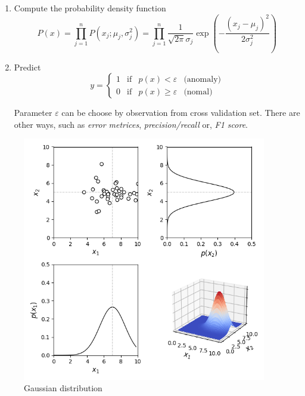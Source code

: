 \begin{itemize}
\begin{enumerate}
        \item Compute the probability density function 
        \begin{equation}
            P(x) = \prod_{j=1}^{n} P(x_j;\mu_j,\sigma_j^2) = \prod_{j=1}^{n} \frac{1}{\sqrt{2\pi}\sigma_j}\exp\left({-\frac{(x_j-\mu_j)^2}{2\sigma_j^2}}\right)
        \end{equation}
        
        \item Predict
        \begin{equation}
            y = \left\{
            \begin{array}{llll}
                1 & \text{if} & p(x) <    \varepsilon & \text{(anomaly)}  \\
                0 & \text{if} & p(x) \geq \varepsilon & \text{(nomal)} 
            \end{array}\right.
        \end{equation}
        
        Parameter $\varepsilon$ can be choose by observation from cross validation set.
        There are other ways, such as \emph{error metrices}, \emph{precision/recall} or, \emph{F1 score}.
    \end{enumerate}
    
    \begin{figure}[!htbp]
        \centering
        \includegraphics[width=4.2in]{./images/gaussianDistribution_3D.png}
        \caption{Gaussian distribution}
    \end{figure}

\end{itemize}


